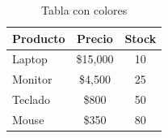 \begin{table}
\centering
{}
\begin{tabularx}{\linewidth}{|X c c|}
\hline
\rowcolor{black} \textbf{\color{white} Producto} & \textbf{\color{white} Precio} & \textbf{\color{white} Stock} \\
\hline
Laptop   & \$15,000 & 10 \\
Monitor  & \$4,500  & 25 \\
Teclado  & \$800    & 50 \\
Mouse    & \$350    & 80 \\
\hline
\end{tabularx}
\caption{Tabla con colores}
\end{table}
